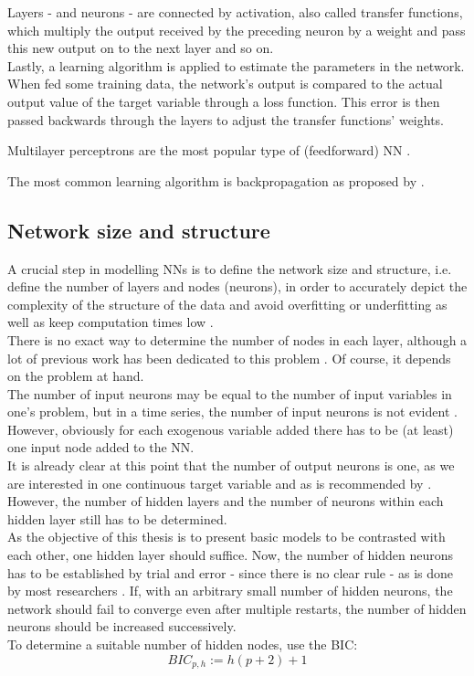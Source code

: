 \documentclass[a4paper, 11pt]{article}
\begin{document}
Layers - and neurons - are connected by activation, also called transfer functions, which multiply the output received by the preceding neuron by a weight and pass this new output on to the next layer and so on.\\
Lastly, a learning algorithm is applied to estimate the parameters in the network. When fed some training data, the network's output is compared to the actual output value of the target variable through a loss function. This error is then passed backwards through the layers to adjust the transfer functions' weights.

Multilayer perceptrons are the most popular type of (feedforward) NN \citep{Balkin.1997, Benkachcha.2015}.

The most common learning algorithm is backpropagation as proposed by \cite{Rumelhart.1986}.

\subsection{Network size and structure}

A crucial step in modelling NNs is to define the network size and structure, i.e. define the number of layers and nodes (neurons), in order to accurately depict the complexity of the structure of the data and avoid overfitting or underfitting as well as keep computation times low \citep{Karsoliya.2012}.\\
There is no exact way to determine the number of nodes in each layer, although a lot of previous work has been dedicated to this problem \citep{Karsoliya.2012}. Of course, it depends on the problem at hand.\\
The number of input neurons may be equal to the number of input variables in one's problem, but in a time series, the number of input neurons is not evident \citep{Zhang.1998}. However, obviously for each exogenous variable added there has to be (at least) one input node added to the NN.\\
It is already clear at this point that the number of output neurons is one, as we are interested in one continuous target variable and as is recommended by \cite{Karsoliya.2012}.\\

However, the number of hidden layers and the number of neurons within each hidden layer still has to be determined. \\
As the objective of this thesis is to present basic models to be contrasted with each other, one hidden layer should suffice. Now, the number of hidden neurons has to be established by trial and error - since there is no clear rule - as is done by most researchers \citep{Karsoliya.2012}. If, with an arbitrary small number of hidden neurons, the network should fail to converge even after multiple restarts, the number of hidden neurons should be increased successively. \\
To determine a suitable number of hidden nodes, \cite{Adhikari.2015} use the BIC:
\begin{equation}
	BIC_{p,h} := h(p+2) + 1
\end{equation}
\end{document}

